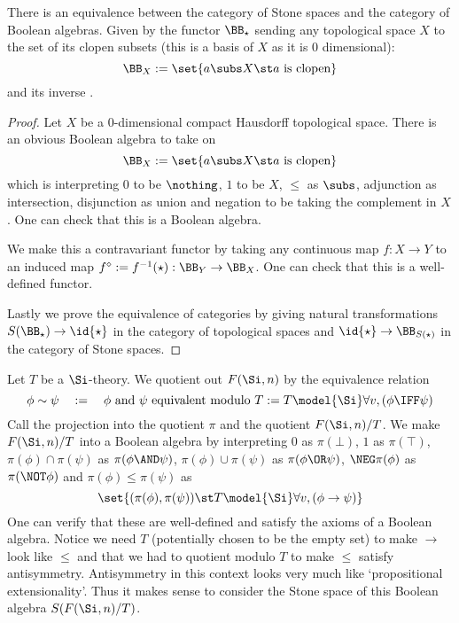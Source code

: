 \begin{prop}
    There is an equivalence between the category of Stone
    spaces and the category of Boolean algebras.
    Given by the functor $\BB_\star$ 
    sending any topological space $X$ to the set of 
    its clopen subsets (this is a basis of $X$ as it is $0$ dimensional):
    \[\BB_X := \set{a \subs X \st a \text{ is clopen}}\]
    and its inverse  .
\end{prop}
\begin{proof}
    Let $X$ be a $0$-dimensional compact Hausdorff topological space.
    There is an obvious Boolean algebra to take on 
    \[\BB_X := \set{a \subs X \st a \text{ is clopen}}\]
    which is interpreting $0$ to be $\nothing$, $1$ to be $X$, 
    $\leq$ as $\subs$,
    adjunction as intersection, disjunction as union and negation to be 
    taking the complement in $X$.
    One can check that this is a Boolean algebra.

    We make this a contravariant functor by taking any continuous map 
    $f : X \to Y$
    to an induced map $f^{\diamond}:= f^{-1}(\star):\BB_Y \to \BB_X$.
    One can check that this is a well-defined functor.

    Lastly we prove the equivalence of categories by giving 
    natural transformations $S(\BB_{\star}) \to \id{\star}$ in
    the category of topological spaces
    and $\id{\star} \to \BB_{S(\star)}$ in the category of Stone spaces.
\end{proof}


\begin{dfn}
    Let $T$ be a $\Si$-theory.
    We quotient out $F(\Si,n)$ by the equivalence relation
    \[  
        \phi \sim \psi \quad := 
        \quad \phi \text{ and } \psi \text{ equivalent modulo } T
        := T \model{\Si} \forall v, (\phi \IFF \psi)
    \]
    Call the projection into the quotient $\pi$
    and the quotient $F(\Si,n) / T$.
    We make $F(\Si,n) / T$ into a Boolean algebra by 
    interpreting $0$ as $\pi(\bot)$, $1$ as $\pi(\top)$, 
    $\pi(\phi) \cap \pi(\psi)$ as $\pi(\phi \AND \psi)$,
    $\pi(\phi) \cup \pi(\psi)$ as $\pi(\phi \OR \psi)$,
    $\NEG \pi(\phi)$ as $\pi(\NOT \phi)$ and 
    $\pi(\phi) \leq \pi(\psi)$ as 
    \[\set{(\pi(\phi),\pi(\psi)) \st T \model{\Si} \forall v, (\phi \to \psi)}\]
    One can verify that these are well-defined and satisfy the axioms of 
    a Boolean algebra.
    Notice we need $T$ (potentially chosen to be the empty set) 
    to make $\to$ look like $\leq$ and that we had to quotient modulo $T$ 
    to make $\leq$ satisfy antisymmetry. 
    Antisymmetry in this context looks very much like 
    `propositional extensionality'.
    Thus it makes sense to consider the Stone space of this Boolean algebra 
    $S(F(\Si,n) / T)$.
\end{dfn}

